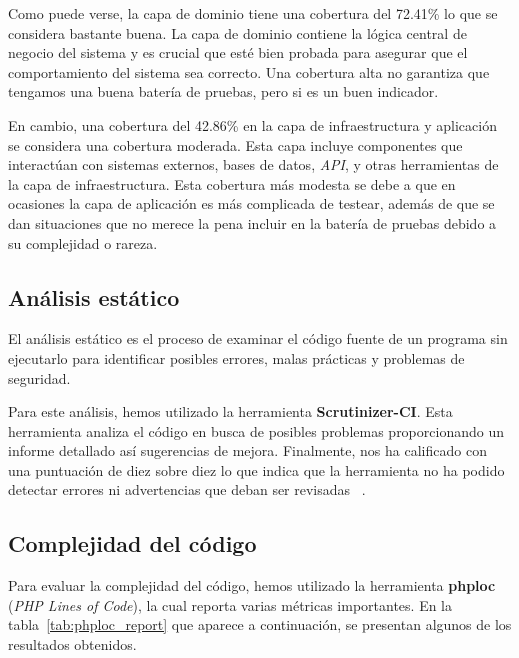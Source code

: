 Como puede verse, la capa de dominio tiene una cobertura del 72.41\% lo que se considera bastante buena.
La capa de dominio contiene la lógica central de negocio del sistema y es crucial que esté bien probada para asegurar
que el comportamiento del sistema sea correcto.
Una cobertura alta no garantiza que tengamos una buena batería de pruebas, pero si es un buen indicador.

En cambio, una cobertura del 42.86\% en la capa de infraestructura y aplicación se considera una cobertura moderada.
Esta capa incluye componentes que interactúan con sistemas externos, bases de datos, \textit{API}, y otras
herramientas de la capa de infraestructura.
Esta cobertura más modesta se debe a que en ocasiones la capa de aplicación es más complicada de testear, además de
que se dan situaciones que no merece la pena incluir en la batería de pruebas debido a su complejidad o rareza.

\subsection*{Análisis estático}

El análisis estático es el proceso de examinar el código fuente de un programa sin ejecutarlo para identificar posibles
errores, malas prácticas y problemas de seguridad.

Para este análisis, hemos utilizado la herramienta \textbf{Scrutinizer-CI}.
Esta herramienta analiza el código en busca de posibles problemas proporcionando un informe detallado así
sugerencias de mejora.
Finalmente, nos ha calificado con una puntuación de diez sobre diez lo que indica que la herramienta no ha podido
detectar errores ni advertencias que deban ser revisadas ~\cite{url_scrutinizer_viu_84_proyecto}.

\subsection*{Complejidad del código}

Para evaluar la complejidad del código, hemos utilizado la herramienta \textbf{phploc} (\textit{PHP Lines of Code}), la
cual reporta varias métricas importantes.
En la tabla~\ref{tab:phploc_report} que aparece a continuación, se presentan algunos de los resultados obtenidos.


